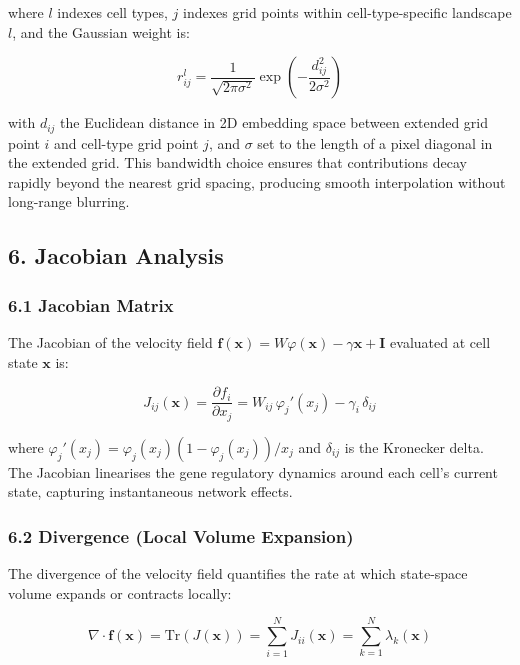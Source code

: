 \documentclass[11pt]{article}
\begin{document}
where $l$ indexes cell types, $j$ indexes grid points within cell-type-specific landscape $l$, and the Gaussian weight is:


\begin{equation}
r_{ij}^l = \frac{1}{\sqrt{2\pi\sigma^2}}\exp\!\left(-\frac{d_{ij}^2}{2\sigma^2}\right) 
\end{equation}


with $d_{ij}$ the Euclidean distance in 2D embedding space between extended grid point $i$ and cell-type grid point $j$, and $\sigma$ set to the length of a pixel diagonal in the extended grid. This bandwidth choice ensures that contributions decay rapidly beyond the nearest grid spacing, producing smooth interpolation without long-range blurring.



\subsection*{6. Jacobian Analysis}


\subsubsection*{6.1 Jacobian Matrix}

The Jacobian of the velocity field $\mathbf{f}(\mathbf{x}) = W\varphi(\mathbf{x}) - \gamma\mathbf{x} + \mathbf{I}$ evaluated at cell state $\mathbf{x}$ is:


\begin{equation}
J_{ij}(\mathbf{x}) = \frac{\partial f_i}{\partial x_j} = W_{ij}\,\varphi_j'(x_j) - \gamma_i\,\delta_{ij} 
\end{equation}


where $\varphi_j'(x_j) = \varphi_j(x_j)\left(1 - \varphi_j(x_j)\right)/x_j$ and $\delta_{ij}$ is the Kronecker delta. The Jacobian linearises the gene regulatory dynamics around each cell's current state, capturing instantaneous network effects.


\subsubsection*{6.2 Divergence (Local Volume Expansion)}

The divergence of the velocity field quantifies the rate at which state-space volume expands or contracts locally:


\begin{equation}
\nabla \cdot \mathbf{f}(\mathbf{x}) = \mathrm{Tr}(J(\mathbf{x})) = \sum_{i=1}^N J_{ii}(\mathbf{x}) = \sum_{k=1}^N \lambda_k(\mathbf{x}) 
\end{equation}
\end{document}
